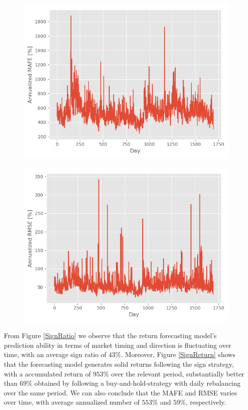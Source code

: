 \begin{figure}
\centering
\begin{minipage}{.5\textwidth}
  \centering
  \includegraphics[scale=0.5]{Plot/EvaluationMAFE.png}
  \label{MAFE}
\end{minipage}%
\begin{minipage}{.5\textwidth}
  \centering
  \includegraphics[scale=0.5]{Plot/EvaluationRMSE.png}
  \label{RMSE}
\end{minipage}
\end{figure}

From Figure \ref{SignRatio} we observe that the return forecasting model's prediction ability in terms of market timing and direction is fluctuating over time, with an average sign ratio of $43\%$. Moreover, Figure \ref{SignReturn} shows that the forecasting model generates solid returns following the sign strategy, with a accumulated return of $953\%$ over the relevant period, substantially better than $69\%$ obtained by following a buy-and-hold-strategy with daily rebalancing over the same period. We can also conclude that the MAFE and RMSE varies over time, with average annualized number of $553\%$ and $59\%$, respectively.

